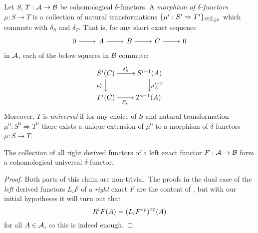 \begin{definition}
  Let $S, \, T: \mathcal{A} \to \mathcal{B}$ be cohomological $\delta$-functors.
  A \emph{morphism of $\delta$-functors} $\mu: S \to T$ is a
  collection of natural transformations $\{\mu^i: S^i \Rightarrow
  T^i\}_{i \in \mathbb{Z}_{\geq 0}}$ which commute with $\delta_S$ and $\delta_T$.
  That is, for any short exact sequence
  \[
    \begin{tikzcd}
      0 & A & B & C & 0
      \arrow[from=1-1, to=1-2]
      \arrow[from=1-2, to=1-3]
      \arrow[from=1-3, to=1-4]
      \arrow[from=1-4, to=1-5]
    \end{tikzcd}
  \]
  in $\mathcal{A}$, each of the below squares in $\mathcal{B}$ commute:
  \[
    \begin{tikzcd}[cramped]
      {S^i(C)} & {S^{i + 1}(A)} \\
      {T^i(C)} & {T^{i + 1}(A)}.
      \arrow["{\delta_S^i}", from=1-1, to=1-2]
      \arrow["{\mu_C^i}"', from=1-1, to=2-1]
      \arrow["{\mu_A^{i + 1}}", from=1-2, to=2-2]
      \arrow["{\delta_T^i}"', from=2-1, to=2-2]
    \end{tikzcd}
  \]
  Moreover, $T$ is \emph{universal} if for any choice of $S$ and
  natural transformation $\mu^0: S^0 \Rightarrow T^0$ there exists a
  unique extension of $\mu^0$ to a morphism of $\delta$-functors $\mu: S \to T$.
\end{definition}

\begin{proposition}
  The collection of all right derived functors of a left exact
  functor $F: \mathcal{A} \to \mathcal{B}$ form a cohomological universal
  $\delta$-functor.
\end{proposition}

\begin{proof}
  Both parts of this claim are non-trivial.
  The proofs in the dual case of the \emph{left} derived functors
  $L_iF$ of a \emph{right} exact $F$ are the content of
  \cite[Theorems~2.4.6 and 2.4.7]{weibel}, but with our initial
  hypotheses it will turn out that
  \[
    R^iF(A) = {(L_i {F}^{\mathrm{op}})}^{\mathrm{op}}(A)
  \]
  for all $A \in \mathcal{A}$, so this is indeed enough.
\end{proof}

